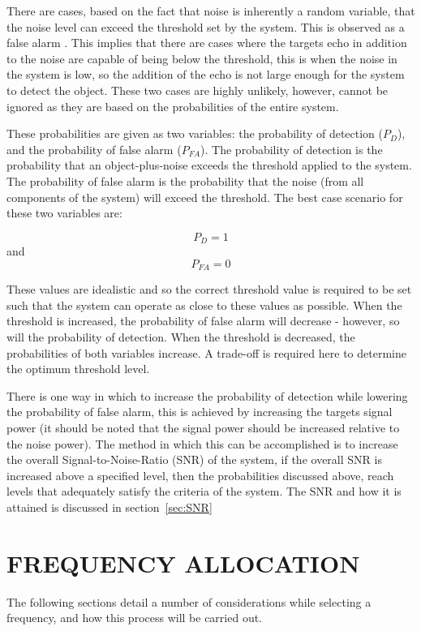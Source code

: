 \documentclass[11pt]{witseiepaper}
\begin{document}
\begin{bibunit}[witseie]
There are cases, based on the fact that noise is inherently a random variable, that the noise level can exceed the threshold set by the system. This is observed as a false alarm \cite[Ch~.3]{radarHandbook}.
This implies that there are cases where the targets echo in addition to the noise are capable of being below the threshold, this is when the noise in the system is low, so the addition of the echo is not large enough for the system to detect the object.
These two cases are highly unlikely, however, cannot be ignored as they are based on the probabilities of the entire system.

These probabilities are given as two variables: the probability of detection ($P_{D}$), and the probability of false alarm ($P_{FA}$). The probability of detection is the probability that an object-plus-noise exceeds the threshold applied to the system. The probability of false alarm is the probability that the noise (from all components of the system) will exceed the threshold.
The best case scenario for these two variables are: 

\begin{equation} \label{eqn:ProbabilityDetection}
P_{D} = 1
\end{equation} 
and 
\begin{equation} \label{eqn:ProbabilityFalseAlarm}
P_{FA} = 0
\end{equation}

These values are idealistic and so the correct threshold value is required to be set such that the system can operate as close to these values as possible.
When the threshold is increased, the probability of false alarm will decrease - however, so will the probability of detection. When the threshold is decreased, the probabilities of both variables increase. A trade-off is required here to determine the optimum threshold level.

There is one way in which to increase the probability of detection while lowering the probability of false alarm, this is achieved by increasing the targets signal power (it should be noted that the signal power should be increased relative to the noise power). The method in which this can be accomplished is to increase the overall Signal-to-Noise-Ratio (SNR) of the system, if the overall SNR is increased above a specified level, then the probabilities discussed above, reach levels that adequately satisfy the criteria of the system. The SNR and how it is attained is discussed in section~\ref{sec:SNR}


\section{FREQUENCY ALLOCATION} \label{sec:FrequencyAllocation}
The following sections detail a number of considerations while selecting a frequency, and how this process will be carried out.


\end{bibunit}
\end{document}
